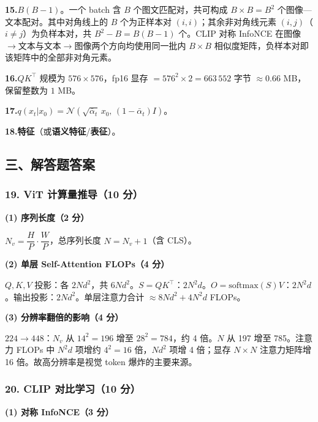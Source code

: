 \documentclass[11pt,a4paper]{article}
\begin{document}
\noindent\textbf{15.}\quad $B(B-1)$。一个 batch 含 $B$ 个图文匹配对，共可构成 $B\times B=B^2$ 个图像—文本配对。其中对角线上的 $B$ 个为正样本对 $(i,i)$；其余非对角线元素 $(i,j)$（$i\neq j$）为负样本对，共 $B^2-B=B(B-1)$ 个。CLIP 对称 InfoNCE 在图像$\to$文本与文本$\to$图像两个方向均使用同一批内 $B\times B$ 相似度矩阵，负样本对即该矩阵中的全部非对角元素。

\noindent\textbf{16.}\quad $QK^{\top}$ 规模为 $576\times 576$，fp16 显存 $=576^2\times 2=663\,552$ 字节 $\approx 0.66$ MB，保留整数为 $\boxed{1}$ MB。

\noindent\textbf{17.}\quad $q(x_t|x_0)=\mathcal{N}\!\left(\sqrt{\bar\alpha_t}\,x_0,\,(1-\bar\alpha_t)I\right)$。

\noindent\textbf{18.}\quad \textbf{特征}（或\textbf{语义特征}/\textbf{表征}）。

\vspace{3cm}

\subsection*{\heiti 三、解答题答案}

\subsubsection*{19. ViT 计算量推导（10 分）}

\noindent\textbf{(1) 序列长度（2 分）}

$N_v=\dfrac{H}{P}\cdot\dfrac{W}{P}$，总序列长度 $N=N_v+1$（含 CLS）。

\noindent\textbf{(2) 单层 Self-Attention FLOPs（4 分）}

$Q,K,V$ 投影：各 $2Nd^2$，共 $6Nd^2$。$S=QK^{\top}$：$2N^2 d$。$O=\mathrm{softmax}(S)V$：$2N^2 d$。输出投影：$2Nd^2$。单层注意力合计 $\approx 8Nd^2+4N^2 d$ FLOPs。

\noindent\textbf{(3) 分辨率翻倍的影响（4 分）}

$224\to 448$：$N_v$ 从 $14^2=196$ 增至 $28^2=784$，约 4 倍。$N$ 从 197 增至 785。注意力 FLOPs 中 $N^2 d$ 项增约 $4^2=16$ 倍，$Nd^2$ 项增 4 倍；显存 $N\times N$ 注意力矩阵增 16 倍。故高分辨率是视觉 token 爆炸的主要来源。

\subsubsection*{20. CLIP 对比学习（10 分）}

\noindent\textbf{(1) 对称 InfoNCE（3 分）}
\end{document}
